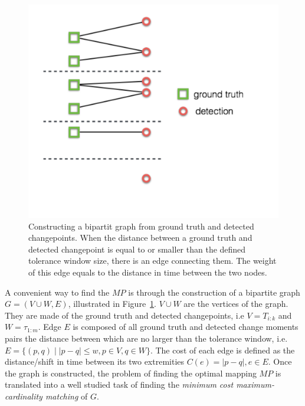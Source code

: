 
\begin{figure}[!htb]
\centering
\includegraphics[width=.7\textwidth]{gfx/chap4/bipartit_graph_cons.pdf}
\caption{Constructing a bipartit graph from ground truth and detected changepoints. When the distance between a ground truth and detected changepoint is equal to or smaller than the defined tolerance window size, there is an edge connecting them. The weight of this edge equals to the distance in time between the two nodes.}
\label{fig:bipartit_graph_cons}
\end{figure}

A convenient way to find the $MP$ is through the construction of a bipartite graph $G = (V \cup W, E)$, illustrated in Figure~\ref{fig:bipartit_graph_cons}.
$V \cup W$ are the vertices of the graph.
They are made of the ground truth and detected changepoints, i.e $V = T_{i:k}$ and $W = \tau_{1:m}$.
Edge $E$ is composed of all ground truth and detected change moments pairs the distance between which are no larger than the tolerance window, i.e. $E = \{(p, q) \mid |p - q| \leq w, p \in V, q \in W \}$.
The cost of each edge is defined as the distance/shift in time between its two extremities $C(e) = |p-q|, e \in E$.
Once the graph is constructed, the problem of finding the optimal mapping $MP$ is translated into a well studied task of finding the \textit{minimum cost maximum-cardinality matching} of $G$.

